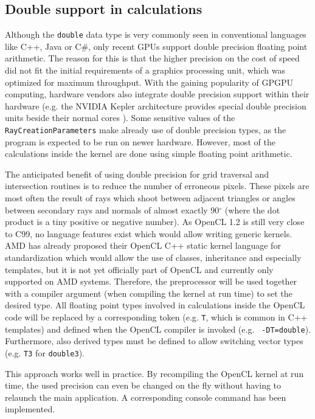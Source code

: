 \subsection{Double support in calculations}

Although the \lstinline!double! data type is very commonly seen in conventional languages like C++, Java or C\#, only recent GPUs support double precision floating point arithmetic. The reason for this is that the higher precision on the cost of speed did not fit the initial requirements of a graphics processing unit, which was optimized for maximum throughput. With the gaining popularity of GPGPU computing, hardware vendors also integrate double precision support within their hardware (e.g. the NVIDIA Kepler architecture provides special double precision units beside their normal cores \cite[p.8]{kepler_arch}). Some sensitive values of the \lstinline!RayCreationParameters! make already use of double precision types, as the program is expected to be run on newer hardware. However, most of the calculations inside the kernel are done using simple floating point arithmetic.

The anticipated benefit of using double precision for grid traversal and intersection routines is to reduce the number of erroneous pixels. These pixels are most often the result of rays which shoot between adjacent triangles or angles between secondary rays and normals of almost exactly 90$^\circ$ (where the dot product is a tiny positive or negative number). As OpenCL 1.2 is still very close to C99, no language features exist which would allow writing generic kernels. AMD has already proposed their OpenCL C++ static kernel language for standardization which would allow the use of classes, inheritance and especially templates, but it is not yet officially part of OpenCL and currently only supported on AMD systems. Therefore, the preprocessor will be used together with a compiler argument (when compiling the kernel at run time) to set the desired type. All floating point types involved in calculations inside the OpenCL code will be replaced by a corresponding token (e.g. \lstinline!T!, which is common in C++ templates) and defined when the OpenCL compiler is invoked (e.g. \lstinline! -DT=double!). Furthermore, also derived types must be defined to allow switching vector types (e.g. \lstinline!T3! for \lstinline!double3!).

This approach works well in practice. By recompiling the OpenCL kernel at run time, the used precision can even be changed on the fly without having to relaunch the main application. A corresponding console command has been implemented.

